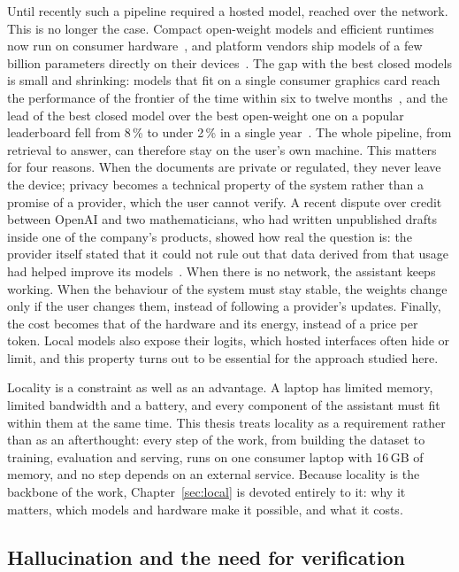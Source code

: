 Until recently such a pipeline required a hosted model, reached over the network. This is no longer the case. Compact
open-weight models and efficient runtimes now run on consumer hardware~\cite{llamacpp,mlx2023}, and platform vendors ship
models of a few billion parameters directly on their devices~\cite{gunter2024apple}. The gap with the best closed models
is small and shrinking: models that fit on a single consumer graphics card reach the performance of the frontier of the
time within six to twelve months~\cite{epoch2025consumergpu}, and the lead of the best closed model over the best open-weight one
on a popular leaderboard fell from 8\,\% to under 2\,\% in a single year~\cite{stanford2025aiindex}. The whole pipeline, from retrieval
to answer, can therefore stay on the user's own machine. This matters for four reasons. When the documents are private
or regulated, they never leave the device; privacy becomes a technical property of the system rather than a promise of a
provider, which the user cannot verify. A recent dispute over credit between OpenAI and two mathematicians, who had
written unpublished drafts inside one of the company's products, showed how real the question is: the provider itself
stated that it could not rule out that data derived from that usage had helped improve its
models~\cite{rits2026navierstokes}. When there is no network, the assistant keeps working. When the behaviour of
the system must stay stable, the weights change only if the user changes them, instead of following a provider's
updates. Finally, the cost becomes that of the hardware and its energy, instead of a price per token. Local models also
expose their logits, which hosted interfaces often hide or limit, and this property turns out to be essential for the
approach studied here.

Locality is a constraint as well as an advantage. A laptop has limited memory, limited bandwidth and a battery, and every
component of the assistant must fit within them at the same time. This thesis treats locality as a requirement rather
than as an afterthought: every step of the work, from building the dataset to training, evaluation and serving, runs on
one consumer laptop with 16\,GB of memory, and no step depends on an external service. Because locality is the backbone
of the work, Chapter~\ref{sec:local} is devoted entirely to it: why it matters, which models and hardware make it
possible, and what it costs.

\subsection{Hallucination and the need for verification}
\label{sec:intro-hallucination}

